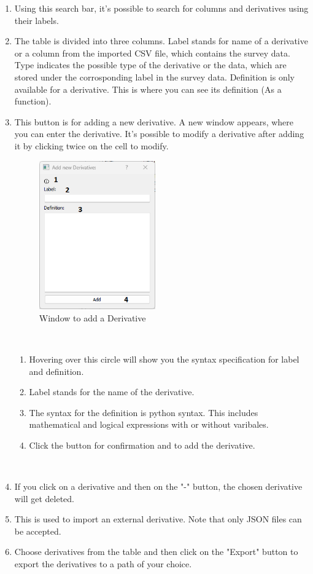 \documentclass{article}
\begin{document}
\begin{enumerate} [label=\textbf{\arabic*})]
    \item Using this search bar, it's possible to search for columns and derivatives using their labels.
    \item The table is divided into three columns. Label stands for name of a derivative or a column from the imported CSV file, which contains the survey data. Type indicates the possible type of the derivative or the data, which are stored under the corrosponding label in the survey data. Definition is only available for a derivative. This is where you can see its definition (As a function).
    \item This button is for adding a new derivative. A new window appears, where you can enter the derivative. It's possible to modify a  derivative after adding it by clicking twice on the cell to modify. \\
    \newpage
    \begin{figure}
        \centering
        \includegraphics[width=5cm]{docs/User Manual/img/newDervNew.png}
        \caption{Window to add a Derivative}
        \label{fig:enter-label}
    \end{figure} \\
    
    \begin{enumerate} [label=\textbf{\arabic*})]
        \item  Hovering over this circle will show you the syntax specification for label and definition.
        \item Label stands for the name of the derivative.
        \item The syntax for the definition is python syntax. This includes mathematical and logical expressions with or without varibales. 
        \item Click the button for confirmation and to add the derivative.
    \end{enumerate} \\
    \item If you click on a derivative and then on the "-" button, the chosen derivative will get deleted.
    \item This is used to import an external derivative. Note that only JSON files can be accepted.
    \item Choose derivatives from the table and then click on the "Export" button to export the derivatives to a path of your choice.
\end{enumerate}
\newpage
\end{document}
